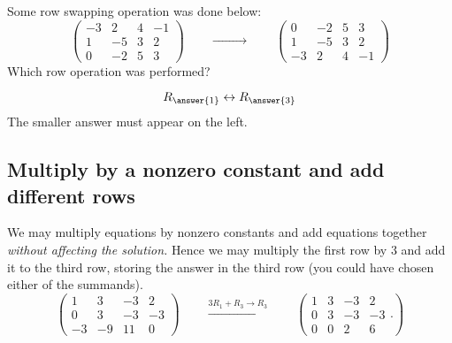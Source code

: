 \documentclass{ximera}
\begin{document}
\begin{question}
  Some row swapping operation was done below:
  \[
    \begin{pmatrix}
      -3 & 2 & 4 & -1 \\
      1 & -5 & 3 & 2 \\
      0 & -2 & 5 & 3
    \end{pmatrix}
    \qquad\xrightarrow{\phantom{R_1 \leftrightarrow R_3}}\qquad
    \begin{pmatrix}
      0 & -2 & 5 & 3 \\
      1 & -5 & 3 & 2 \\
      -3 & 2 & 4 & -1
    \end{pmatrix}
  \]
  Which row operation was performed?
  \begin{prompt}
    \[
      R_{\answer{1}} \leftrightarrow R_{\answer{3}}
    \]
    The smaller answer must appear on the left.
  \end{prompt}
\end{question}


\subsection{Multiply by a nonzero constant and add different rows}
We may multiply equations by nonzero constants and add equations together
\emph{without affecting the solution.} Hence we may multiply the first
row by $3$ and add it to the third row, storing the answer in the
third row (you could have chosen either of the summands).
\[
  \left(
    \begin{array}{ccc|c}
      1 &   3 & -3 & 2  \\
      0 &   3 & -3 & -3 \\
      -3& -9  & 11 & 0
    \end{array}
  \right)
  \qquad\xrightarrow{3R_1+R_3\rightarrow R_3}\qquad
  \left(
    \begin{array}{ccc|c}
      1 &   3 & -3 & 2  \\
      0 &   3 & -3 & -3 \\
      0& 0  & 2 & 6
    \end{array}.
  \right)
\]

\begin{question}
\end{question}
\end{document}
